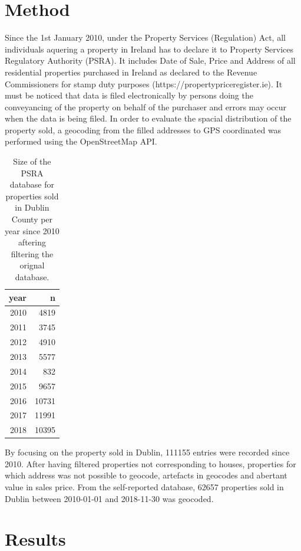 \documentclass[]{elsarticle} %
\begin{document}
\section{Method}\label{method}

Since the 1st January 2010, under the Property Services (Regulation)
Act, all individuals aquering a property in Ireland has to declare it to
Property Services Regulatory Authority (PSRA). It includes Date of Sale,
Price and Address of all residential properties purchased in Ireland as
declared to the Revenue Commissioners for stamp duty purposes
(https://propertypriceregister.ie). It must be noticed that data is
filed electronically by persons doing the conveyancing of the property
on behalf of the purchaser and errors may occur when the data is being
filed. In order to evaluate the spacial distribution of the property
sold, a geocoding from the filled addresses to GPS coordinated was
performed using the OpenStreetMap API.

\begin{table}[!h]

\caption{\label{tab:dublin-sample-size}Size of the PSRA database for properties sold in Dublin County per year since 2010 aftering filtering the orignal database.}
\centering
\fontsize{8}{10}\selectfont
\begin{tabular}{rr}
\toprule
year & n\\
\midrule
2010 & 4819\\
2011 & 3745\\
2012 & 4910\\
2013 & 5577\\
2014 & 832\\
2015 & 9657\\
2016 & 10731\\
2017 & 11991\\
2018 & 10395\\
\bottomrule
\end{tabular}
\end{table}

By focusing on the property sold in Dublin, 111155 entries were recorded
since 2010. After having filtered properties not corresponding to
houses, properties for which address was not possible to geocode,
artefacts in geocodes and abertant value in sales price. From the
self-reported database, 62657 properties sold in Dublin between
2010-01-01 and 2018-11-30 was geocoded.

\section{Results}\label{results}
\end{document}
